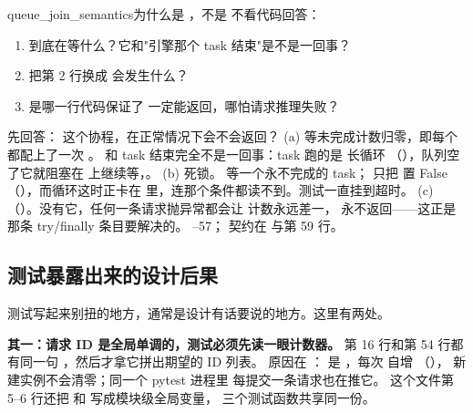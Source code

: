 \begin{checkpoint}{queue_join_semantics}{为什么是 ，不是 }
不看代码回答：
\begin{enumerate}[label=(\alph*)]
  \item {} 到底在等什么？它和"引擎那个 task 结束"是不是一回事？
  \item 把第 2 行换成  会发生什么？
  \item 是哪一行代码保证了  一定能返回，哪怕请求推理失败？
\end{enumerate}
\hint 先回答： 这个协程，在正常情况下会不会返回？
\ifshowanswers
\tcblower
\answer (a) 等未完成计数归零，即每个  都配上了一次 。
和 task 结束完全不是一回事：task 跑的是  长循环
（），队列空了它就阻塞在
 上继续等，。
(b) 死锁。 等一个永不完成的 task； 只把 
置 False（），而循环这时正卡在
 里，连那个条件都读不到。测试一直挂到超时。
(c) 
（）。没有它，任何一条请求抛异常都会让
计数永远差一， 永不返回——这正是  那条 try/finally 条目要解决的。
\whereincode {}--57；
契约在  与第 59 行。
\fi
\end{checkpoint}

\subsection{测试暴露出来的设计后果}
\label{sec:test-consequence}

测试写起来别扭的地方，通常是设计有话要说的地方。这里有两处。

\textbf{其一：请求 ID 是全局单调的，测试必须先读一眼计数器。}
 第 16 行和第 54 行都有同一句
，然后才拿它拼出期望的 ID 列表。
原因在 ： 是
，每次  自增
（），
新建实例不会清零；同一个 pytest 进程里  每提交一条请求也在推它。
这个文件第 5--6 行还把  和  写成模块级全局变量，
三个测试函数共享同一份。

